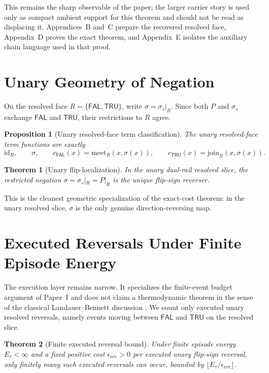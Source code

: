 \documentclass[11pt]{article}
\newtheorem{theorem}{Theorem}
\newtheorem{proposition}{Proposition}
\theoremstyle{remark}
\newcommand{\FAL}{\ensuremath{\mathsf{FAL}}}
\newcommand{\TRU}{\ensuremath{\mathsf{TRU}}}
\newcommand{\meetR}{\ensuremath{\mathrm{meet}_R}}
\newcommand{\joinR}{\ensuremath{\mathrm{join}_R}}
\begin{document}
This remains the sharp observable of the paper; the larger carrier story is
used only as compact ambient support for this theorem and should not be
read as displacing it. Appendices~B and~C prepare the recovered resolved
face, Appendix~D proves the exact theorem, and Appendix~E isolates the
auxiliary chain language used in that proof.

\section{Unary Geometry of Negation}

On the resolved face $R=\{\FAL,\TRU\}$, write $\sigma=\sigma_s|_R$. Since
both $P$ and $\sigma_s$ exchange $\FAL$ and $\TRU$, their restrictions to
$R$ agree.

\begin{proposition}[Unary resolved-face term classification]
The unary resolved-face term functions are exactly
\[
\mathrm{id}_R,\qquad \sigma,\qquad
c_{\FAL}(x)=\meetR(x,\sigma(x)),\qquad
c_{\TRU}(x)=\joinR(x,\sigma(x)).
\]
\end{proposition}

\begin{theorem}[Unary flip-localization]
In the unary dual-rail resolved slice, the restricted negation
$\sigma=\sigma_s|_R=P|_R$ is the unique flip-sign reverser.
\end{theorem}

This is the cleanest geometric specialization of the exact-cost theorem: in
the unary resolved slice, $\sigma$ is the only genuine direction-reversing
map.

\section{Executed Reversals Under Finite Episode Energy}

The execution layer remains narrow. It specializes the finite-event budget
argument of Paper~I \cite{wcy1} and does not claim a thermodynamic theorem
in the sense of the classical Landauer--Bennett discussion
\cite{landauer,bennett}. We count only executed unary resolved reversals,
namely events moving between $\FAL$ and $\TRU$ on the resolved slice.

\begin{theorem}[Finite executed reversal bound]
Under finite episode energy $E_\tau<\infty$ and a fixed positive cost
$\epsilon_{\mathrm{rev}}>0$ per executed unary flip-sign reversal, only
finitely many such executed reversals can occur, bounded by
$\lfloor E_\tau/\epsilon_{\mathrm{rev}}\rfloor$.
\end{theorem}
\end{document}
